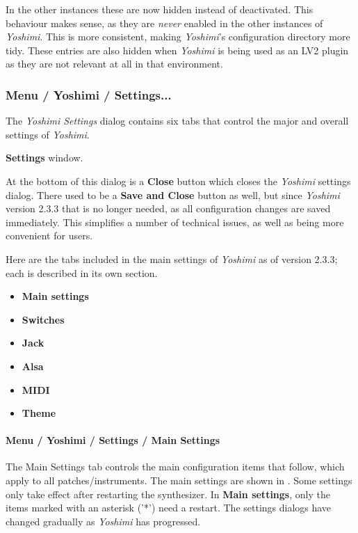    In the other instances these are now hidden instead of deactivated.  This
   behaviour makes sense, as they are \textsl{never} enabled in the other
   instances of \textsl{Yoshimi}. This is more consistent, making
   \textsl{Yoshimi}'s configuration directory more tidy. These entries are
   also hidden when \textsl{Yoshimi} is being used as an LV2 plugin as they
   are not relevant at all in that environment.

\subsubsection{Menu / Yoshimi / Settings...}
\label{subsubsec:menu_yoshimi_settings}

   The \textsl{Yoshimi Settings} dialog contains six tabs that control the
   major and overall settings of \textsl{Yoshimi}.

   \textbf{Settings} window.

   At the bottom of this dialog is a \textbf{Close} button which closes the
   \textsl{Yoshimi} settings dialog. There used to be a \textbf{Save and Close}
   button as well, but since \textsl{Yoshimi} version 2.3.3 that is no longer
   needed, as all configuration changes are saved immediately. This simplifies
   a number of technical issues, as well as being more convenient for users.

   Here are the tabs included in the main settings of \textsl{Yoshimi}
   as of version 2.3.3; each is described in its own section.

   \begin{itemize}
      \item \textbf{Main settings}
      \item \textbf{Switches}
      \item \textbf{Jack}
      \item \textbf{Alsa}
      \item \textbf{MIDI}
      \item \textbf{Theme}
   \end{itemize}

\paragraph{Menu / Yoshimi / Settings / Main Settings}
\label{paragraph:menu_yoshimi_settings_main_settings}

   The Main Settings tab controls the main configuration items that
   follow, which apply to all patches/instruments.
   The main settings are shown in
   .
   Some settings only take effect after restarting the synthesizer.
   In \textbf{Main settings}, only the items marked with an asterisk ('*')
   need a restart.
   The settings dialogs have changed gradually as
   \textsl{Yoshimi} has progressed.


